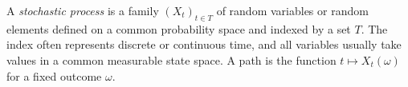 
A \emph{stochastic process} is a family $(X_t)_{t\in T}$ of random variables or random elements defined on a common probability space and indexed by a set $T$. The index often represents discrete or continuous time, and all variables usually take values in a common measurable state space. A path is the function $t\mapsto X_t(\omega)$ for a fixed outcome $\omega$.
